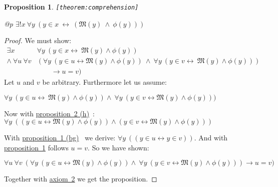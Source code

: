 \documentclass[a4paper,german,10pt,twoside]{book}
\newtheorem{prop}[thm]{Proposition}
\theoremstyle{definition}
\theoremstyle{remark}
\begin{document}
\begin{prop}
\label{theorem:comprehension} \hypertarget{theorem:comprehension}{}
{\tt \tiny [\verb]theorem:comprehension]]}
\mbox{}
\begin{longtable}{{@{\extracolsep{\fill}}p{\linewidth}}}
\centering $\exists! x\ \forall y\ (y \in x\ \leftrightarrow\ (\mathfrak{M}(y)\ \land\ \phi(y)))$
\end{longtable}

\end{prop}
\begin{proof}
We must show:
$$
\begin{array}{rl}
\exists x                      & \forall y \ (y \in x \leftrightarrow  \ \mathfrak{M}(y) \land \phi(y)) \\
\land \ \forall u \ \forall v  & (\forall y \ (y \in u \leftrightarrow \mathfrak{M}(y) \land \phi(y)) \ \land  \ \forall y \ ( y \in v \leftrightarrow \ \mathfrak{M}(y) \land \phi(y))) \\
       & \qquad \rightarrow u = v)
\end{array}
$$
Let $u$ and $v$ be arbitrary. Furthermore let us assume:

\par
$\forall y \ (y \in u \leftrightarrow \ \mathfrak{M}(y) \land \phi(y)) \land \ \forall y \ ( y \in v \leftrightarrow \mathfrak{M}(y)
\land \phi(y)))$

\par
Now with \hyperref{http://www.qedeq.org/0_04_07/doc/math/qedeq_logic_v1_en.pdf}{}{theorem:predicateCalculus/h}{proposition~2 (h)}~\cite{l}: $\forall y \ ((y \in u \leftrightarrow \mathfrak{M}(y) \land \phi(y)) \land (y \in v \leftrightarrow \mathfrak{M}(y) \land \phi(y)))$

\par
With \hyperref{http://www.qedeq.org/0_04_07/doc/math/qedeq_logic_v1_en.pdf}{}{theorem:propositionalCalculus/bg}{proposition~1 (bg)}~\cite{l} we derive: $\forall y \ ((y \in u \leftrightarrow y \in v ))$. And with \hyperlink{theorem:extensonalityEquivalence}{proposition~1} follows $u = v$. So we have shown:

\par
$\forall u \ \forall v \ (\forall y \ (y \in u \leftrightarrow \mathfrak{M}(y) \land \phi(y)) \land \ \forall y \ (y \in v \leftrightarrow \mathfrak{M}(y) \land \phi(y))) \rightarrow u = v)$

\par
Together with \hyperlink{axiom:comprehension}{axiom~2} we get the proposition.
\end{proof}
\end{document}

